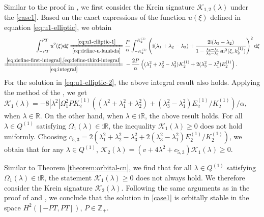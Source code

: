 \documentclass[11pt,reqno]{amsart}
\newcommand{\ii}{\mathrm{i}}
\newcommand{\sn}{\mathrm{sn}}
\newcommand{\dd}{\mathrm{d}}
\numberwithin{equation}{section}
\begin{document}
Similar to the proof in , we first consider the Krein signature $\mathcal{K}_{1,2}(\lambda)$ under the \ref{case1}. 
Based on the exact expressions of the function $u(\xi)$ defined in equation \eqref{eq:u1-elliptic}, we obtain 
	\begin{equation}\nonumber
		\begin{split}
			 \int_{-PT}^{PT}u^2(\xi)\dd \xi 
			\xlongequal[\eqref{eq:define-u-lambda}]{\eqref{eq:u1-elliptic-1}}	&\
			\frac{P}{\alpha}\int_{-K^{(1)}_2}^{K^{(1)}_2}\left(\ii(\lambda_1+\lambda_2-\lambda_3) + \frac{2\ii (\lambda_3-\lambda_2)}{1-\frac{\lambda_2-\lambda_1}{\lambda_3-\lambda_1}\sn^2(\xi,  k^{(1)}_2)}\right)^2\dd \xi\\
			\xlongequal[\eqref{eq:integral}]{\eqref{eq:define-first-integral}, \eqref{eq:define-third-integral}}&\ 
			-\frac{2P}{\alpha}\left((\lambda_1^2+\lambda_2^2-\lambda_3^2)  K^{(1)}_2+2(\lambda_3^2-\lambda_1^2) E^{(1)}_2\right).
		\end{split}
	\end{equation}
	For the solution in \eqref{eq:u1-elliptic-2}, the above integral result also holds. 
	Applying the method of the  , we get
	$	\mathcal{K}_1(\lambda)	=-8|\lambda^2| \Omega_1^2P  K^{(1)}_2 ((\lambda^2+\lambda_1^2+\lambda_2^2)+(\lambda_3^2-\lambda_1^2) E^{(1)}_2/  K^{(1)}_2)/\alpha$,
	when $\lambda\in \mathbb{R}$. 
	On the other hand, when $\lambda \in \ii \mathbb{R}$, the above result holds.
	For all $\lambda\in  Q^{(1)} $ satisfying $\Omega_1(\lambda)\in \ii \mathbb{R}$, the inequality $\mathcal{K}_1(\lambda)\ge 0$ does not hold uniformly.
	Choosing $c_{5,3}=2(\lambda_1^2+\lambda_2^2-\lambda_3^2+2(\lambda_3^2-\lambda_1^2)E_2^{(1)}/K_2^{(1)})$, we obtain that for any $\lambda\in Q^{(1)}$, $\mathcal{K}_2(\lambda)=(v+4\lambda^2+c_{5,3})\mathcal{K}_1(\lambda)\ge 0$.

\newenvironment{proof-orbital-dn}{\emph{Proof of \Cref{theorem:orbital-dn}.}}{\hfill$\Box$\medskip}
\begin{proof-orbital-dn}
	Similar to Theorem \ref{theorem:orbital-cn}, we find that for all $\lambda\in  Q^{(1)} $ satisfying $\Omega_1(\lambda)\in \ii \mathbb{R}$, the statement $\mathcal{K}_1(\lambda)\ge 0$ does not always hold.  We therefore consider the Krein signature $\mathcal{K}_2(\lambda)$.
	Following the same arguments as in the proof of  and  , we conclude that the solution in \ref{case1} is orbitally stable in the space $H^2([-PT,PT])$, $P\in \mathbb{Z}_+$.
\end{proof-orbital-dn}
\end{document}
